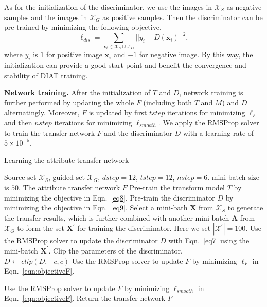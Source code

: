 \documentclass[journal]{IEEEtran}
\begin{document}
As for the initialization of the discriminator, we use the images in $\mathcal{X}_S$ as negative samples and the images in $\mathcal{X}_G$ as positive samples.
Then the discriminator can be pre-trained by minimizing the following objective,
\begin{equation}\label{eq9}
  \ell_{dis} = \sum_{\mathbf{x}_i \in \mathcal{X}_S \cup \mathcal{X}_G}||y_i-D(\mathbf{x}_i)||^2,
\end{equation}
where $y_i$ is $1$ for positive image $\mathbf{x}_i$ and $-1$ for negative image.
By this way, the initialization can provide a good start point and benefit the convergence and stability of DIAT training.



\textbf{Network training.}\quad
After the initialization of $T$ and $D$, network training is further performed by updating the whole $F$ (including both $T$ and $M$) and $D$ alternatingly.
Moreover, $F$ is updated by first $tstep$ iterations for minimizing $\ell_F$ and then $nstep$ iterations for minimizing $\ell_{smooth}$.
We apply the RMSProp solver~\cite{hinton2012rmsprop} to train the transfer network $F$ and the discriminator $D$ with a learning rate of $5\times 10^{-5}$.

\begin{algorithm}[!tbp]
\caption{Learning the attribute transfer network}\label{alg1}
\begin{algorithmic}[1]
\renewcommand{\algorithmicrequire}{\textbf{Input:}}
\renewcommand{\algorithmicensure}{\textbf{End}}
\REQUIRE Source set $\mathcal{X}_S$, guided set $\mathcal{X}_G$, $dstep=12$, $tstep=12$, $nstep=6$. mini-batch size is $50$.
\renewcommand{\algorithmicrequire}{\textbf{Output:}}
\renewcommand{\algorithmicensure}{\textbf{End}}
\REQUIRE The attribute transfer network $F$
\STATE
Pre-train the transform model $T$ by minimizing the objective in Eqn.~\eqref{eq8}.
\STATE
Pre-train the discriminator $D$ by minimizing the objective in Eqn.~\eqref{eq9}.
\STATE
Select a mini-bath $\mathbf{X}$ from $\mathcal{X}_S$ to generate the transfer results, which is further combined with another mini-batch $\mathbf{A}$ from $\mathcal{X}_G$ to form the set $\mathbf{X}^\prime$ for training the discriminator. Here we set $|\mathcal{X}^\prime|=100$.
\STATE
Use the RMSProp solver to update the discriminator $D$ with Eqn.~\eqref{eq7} using the mini-batch $\mathbf{X}^\prime$.
\ENDFOR
\STATE
Clip the parameters of the discriminator. \\$D\leftarrow clip(D,-c,c)$
\STATE
Use the RMSProp solver to update $F$ by minimizing $\ell_F$ in Eqn.~\eqref{eqn:objectiveF}.
\ENDFOR

\STATE
Use the RMSProp solver to update $F$ by minimizing $\ell_{smooth}$ in Eqn.~\eqref{eqn:objectiveF}.
\ENDFOR
\ENDWHILE
\STATE
Return the transfer network $F$
\end{algorithmic}
\end{algorithm}
\end{document}
